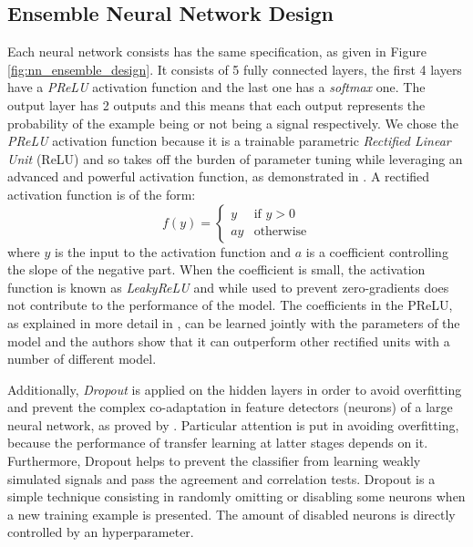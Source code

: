 \documentclass[conference]{IEEEtran}
\begin{document}
\subsection{Ensemble Neural Network Design}
\label{sec:NN_design}
Each neural network consists has the same specification, as given in Figure
\ref{fig:nn_ensemble_design}. It consists of 5 fully connected layers, the first
4 layers have a \textit{PReLU} activation function and the last one has a
\textit{softmax} one. The output layer has 2 outputs and this means that each
output represents the probability of the example being or not being a signal
respectively. We chose the \textit{PReLU} activation function because it is a
trainable parametric \textit{Rectified Linear Unit} (ReLU)  and so takes off the
burden of parameter tuning while leveraging an advanced and powerful activation
function, as demonstrated in \cite{he2015delving}. A rectified activation
function is of the form:
\begin{equation}
	f(y) = \begin{cases} y & \text{if } y > 0 \\ ay & \text{otherwise} \end{cases}
	\label{eq:relu}
\end{equation}
where $y$ is the input to the activation function and $a$ is a coefficient
controlling the slope of the negative part. When the coefficient is small, the
activation function is known as \textit{LeakyReLU} and while used to prevent
zero-gradients does not contribute to the performance of the model. The
coefficients in the PReLU, as explained in more detail in \cite{he2015delving},
can be learned jointly with the parameters of the model and the authors show
that it can outperform other rectified units with a number of different model.

Additionally, \textit{Dropout} is applied on the hidden layers in order to avoid
overfitting and prevent the complex co-adaptation in feature detectors (neurons) of a large neural network, as proved by \cite{srivastava2014dropout, hinton2012improving}. Particular attention is put in avoiding overfitting, because the performance of transfer learning at latter stages depends on it. Furthermore, Dropout helps to prevent the classifier from learning weakly simulated signals and pass the agreement and correlation
tests. Dropout is a simple technique consisting in randomly omitting or
disabling some neurons when a new training example is presented. The amount of
disabled neurons is directly controlled by an hyperparameter.
\end{document}
